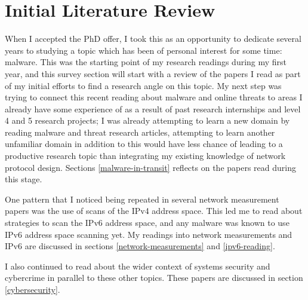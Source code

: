 \documentclass[10pt,sigconf]{acmart}
\begin{document}
\section{Initial Literature Review}

When I accepted the PhD offer, I took this as an opportunity to dedicate several years to studying a topic which has been of personal interest for some time: malware.
This was the starting point of my research readings during my first year, and this survey section will start with a review of the papers I read as part of my initial efforts to find a research angle on this topic.
My next step was trying to connect this recent reading about malware and online threats to areas I already have some experience of as a result of past research internships and level 4 and 5 research projects;
I was already attempting to learn a new domain by reading malware and threat research articles, attempting to learn another unfamiliar domain in addition to this would have less chance of leading to a productive research topic than integrating my existing knowledge of network protocol design.
Sections \ref{malware-in-transit} reflects on the papers read during this stage.

One pattern that I noticed being repeated in several network measurement papers was the use of scans of the IPv4 address space.
This led me to read about strategies to scan the IPv6 address space, and any malware was known to use IPv6 address space scanning yet.
My readings into network measurements and IPv6 are discussed in sections \ref{network-measurements} and \ref{ipv6-reading}.

I also continued to read about the wider context of systems security and cybercrime in parallel to these other topics.
These papers are discussed in section \ref{cybersecurity}.
\end{document}

